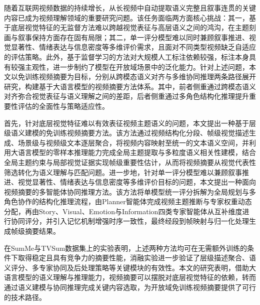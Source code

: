 
\begin{chineseabstract}

随着互联网视频数据的持续增长，从长视频中自动提取语义完整且叙事连贯的关键内容已成为视频理解领域的重要研究问题。该任务面临两方面核心挑战：其一，基于底层视觉特征的无监督方法难以跨越视觉表征与高层语义之间的鸿沟，在主题刻画与叙事保持方面存在固有局限；其二，单一评分模型难以同时兼顾叙事推进、视觉显著性、情绪表达与信息密度等多维评价需求，且面对不同类型视频缺乏自适应的评估策略。此外，基于监督学习的方法对大规模人工标注依赖较强，标注本身具有较强主观性，进一步制约了模型在开放域场景中的泛化能力。针对上述问题，本文以免训练视频摘要为目标，分别从跨模态语义对齐与多维协同推理两条路径展开研究，构建基于大语言模型的视频摘要方法体系。其中，前者侧重通过跨模态语义对齐弥合视觉表征与语义理解之间的差距，后者侧重通过多角色结构化推理提升重要性评估的全面性与策略适应性。

首先，针对底层视觉特征难以有效表征视频主题语义的问题，本文提出一种基于层级语义建模的免训练视频摘要方法。该方法通过视频结构化分段、帧级视觉描述生成、场景级与视频级文本逐层聚合，将视频内容映射至统一的文本语义空间，并利用大语言模型的零样本推理能力完成全局主题提取与多粒度语义相关性建模，结合全局主题约束与局部视觉证据实现帧级重要性估计，从而将视频摘要从视觉代表性筛选转化为语义理解与匹配问题。进一步地，针对单一评分模型难以兼顾叙事推进、视觉显著性、情绪表达与信息密度等多维评价目标的问题，本文提出一种面向视频摘要的多智能体协同推理方法。该方法将单模型统一评分拆解为全局规划与多角色协作的结构化推理流程，由Planner智能体完成视频主题推断与专家权重动态分配，再由Story、Visual、Emotion与Information四类专家智能体从互补维度进行协同评分，并引入记忆机制增强时序一致性，最终经段到帧映射与归一化处理生成帧级摘要结果。

在SumMe与TVSum数据集上的实验表明，上述两种方法均可在无需额外训练的条件下取得稳定且具有竞争力的摘要性能，消融实验进一步验证了层级描述聚合、语义评分、多专家协同及后处理策略等关键模块的有效性。本文的研究表明，借助大语言模型的语义理解与推理能力，视频摘要可以摆脱对底层视觉特征的依赖，转而通过语义建模与协同推理完成关键内容选取，为开放域免训练视频摘要提供了可行的技术路径。


\end{chineseabstract}

